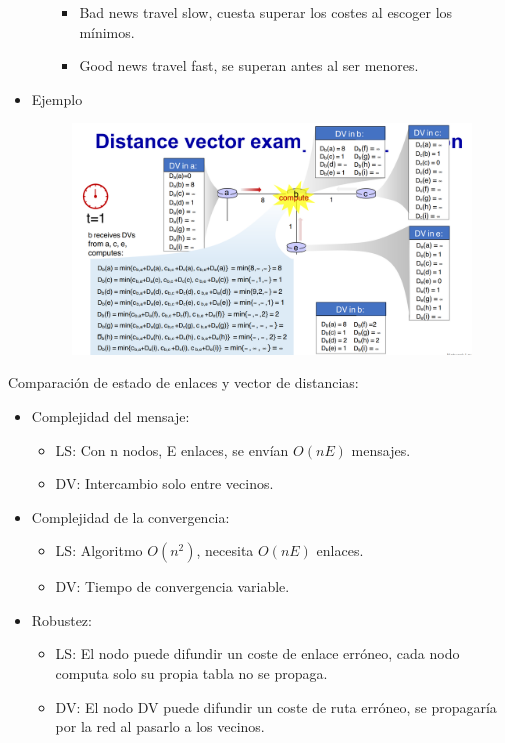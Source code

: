 \documentclass[12pt, twoside, openright]{report} %
\begin{document}
\begin{itemize}
\begin{itemize}
      \begin{itemize}
      \item
        Bad news travel slow, cuesta superar los costes al escoger los
        mínimos.
      \item
        Good news travel fast, se superan antes al ser menores.
      \end{itemize}
    \end{itemize}
  \item
    Ejemplo
	\begin{figure}[H]
		{\includegraphics[scale=.25]{Untitled 44.png}}
	\end{figure}
    \end{itemize}
  

	Comparación de estado de enlaces y vector de distancias:

    \begin{itemize}
    \item
      Complejidad del mensaje:

      \begin{itemize}
      \item
        LS: Con n nodos, E enlaces, se envían \(O(nE)\) mensajes.
      \item
        DV: Intercambio solo entre vecinos.
      \end{itemize}
    \item
      Complejidad de la convergencia:

      \begin{itemize}
      \item
        LS: Algoritmo \(O(n^2)\), necesita \(O(nE)\) enlaces.
      \item
        DV: Tiempo de convergencia variable.
      \end{itemize}
	  \pagebreak
    \item
      Robustez:

      \begin{itemize}
      \item
        LS: El nodo puede difundir un coste de enlace erróneo, cada nodo
        computa solo su propia tabla no se propaga.
      \item
        DV: El nodo DV puede difundir un coste de ruta erróneo, se
        propagaría por la red al pasarlo a los vecinos.
      \end{itemize}
    \end{itemize}
\end{document}
